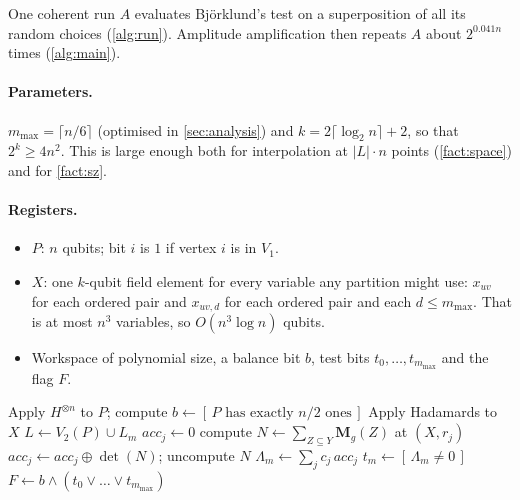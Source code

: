 \documentclass[11pt,a4paper]{article}
\theoremstyle{plain}
\theoremstyle{remark}
\newcommand{\GF}{\mathrm{GF}}
\begin{document}
One coherent run $A$ evaluates Björklund's test on a superposition of all its random choices (\cref{alg:run}). Amplitude amplification then repeats $A$ about $2^{0.041n}$ times (\cref{alg:main}).

\paragraph{Parameters.}
$m_{\max} = \lceil n/6 \rceil$ (optimised in \cref{sec:analysis}) and $k = 2\lceil \log_2 n\rceil + 2$, so that $2^k \ge 4n^2$. This is large enough both for interpolation at $|L|\cdot n$ points (\cref{fact:space}) and for \cref{fact:sz}.

\paragraph{Registers.}
\begin{itemize}[nosep]
  \item $P$: $n$ qubits; bit $i$ is $1$ if vertex $i$ is in $V_1$.
  \item $X$: one $k$-qubit field element for every variable any partition might use: $x_{uv}$ for each ordered pair and $x_{uv,d}$ for each ordered pair and each $d \le m_{\max}$. That is at most $n^3$ variables, so $O(n^3 \log n)$ qubits.
  \item Workspace of polynomial size, a balance bit $b$, test bits $t_0,\dots,t_{m_{\max}}$ and the flag $F$.
\end{itemize}

\begin{algorithm}[t]
\caption{One coherent run $A$ (sets the flag $F$)}\label{alg:run}
\begin{algorithmic}[1]
\State Apply $H^{\otimes n}$ to $P$; compute $b \gets [\,P \text{ has exactly } n/2 \text{ ones}\,]$
\State Apply Hadamards to $X$ 
  \State $L \gets V_2(P) \cup L_m$ 
   
    \State $\mathit{acc}_j \gets 0$
     
      \State compute $N \gets \sum_{Z\subseteq Y}\mathbf{M}_{g}(Z)$ at $(X, r_j)$ 
      \State $\mathit{acc}_j \gets \mathit{acc}_j \oplus \det(N)$; uncompute $N$ \Comment{XOR in $\GF(2^k)$}
    \EndFor
  \EndFor
  \State $\Lambda_m \gets \sum_j c_j\, \mathit{acc}_j$ 
  \State $t_m \gets [\,\Lambda_m \neq 0\,]$
\EndFor
\State $F \gets b \wedge (t_0 \vee \dots \vee t_{m_{\max}})$
\end{algorithmic}
\end{algorithm}
\end{document}

